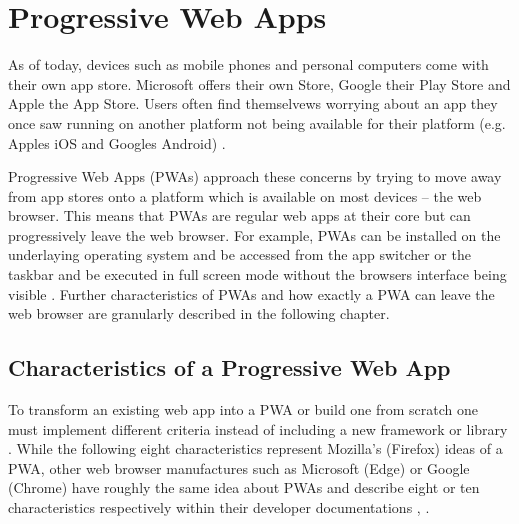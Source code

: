 \section{Progressive Web Apps}
\label{sec:theorieC}


As of today, devices such as mobile phones and personal computers come with their own app store. Microsoft offers their own Store, Google their Play Store and Apple the App Store. Users often find themselvews worrying about an app they once saw running on another platform not being available for their platform (e.g. Apples iOS and Googles Android) \cite[p. 3]{sheppardBeginningProgressiveWeb2017}.

Progressive Web Apps (PWAs) approach these concerns by trying to move away from app stores onto a platform which is available on most devices – the web browser. This means that PWAs are regular web apps at their core but can progressively leave the web browser. For example, PWAs can be installed on the underlaying operating system and be accessed from the app switcher or the taskbar and be executed in full screen mode without the browsers interface being visible \cite[p. 26]{liebelProgressiveWebApps2019}. Further characteristics of PWAs and how exactly a PWA can leave the web browser are granularly described in the following chapter.


\subsection{Characteristics of a Progressive Web App}
\label{sec:theorieCa}


To transform an existing web app into a PWA or build one from scratch one must implement different criteria instead of including a new framework or library \cite[p. 6]{sheppardBeginningProgressiveWeb2017}.
While the following eight characteristics represent Mozilla’s (Firefox) ideas of a PWA, other web browser manufactures such as Microsoft (Edge) or Google (Chrome) have roughly the same idea about PWAs and describe eight or ten characteristics respectively within their developer documentations \cite[p. 90]{liebelProgressiveWebApps2019}, \cite{ProgressiveWebApps}.

